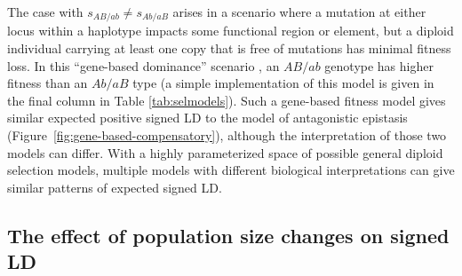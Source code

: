 \documentclass[]{article}
\begin{document}
The case with \(s_{AB/ab} \not= s_{Ab/aB}\) arises in a scenario where a
mutation at either locus within a haplotype impacts some functional region or
element, but a diploid individual carrying at least one copy that is free of
mutations has minimal fitness loss. In this ``gene-based dominance'' scenario
\citep[e.g.,][]{Sanjak2017-zw}, an \(AB/ab\) genotype has higher fitness than
an \(Ab/aB\) type (a simple implementation of this model is given in the final
column in Table \ref{tab:selmodels}). Such a gene-based fitness model gives
similar expected positive signed LD to the model of antagonistic epistasis
(Figure~\ref{fig:gene-based-compensatory}), although the interpretation of
those two models can differ. With a highly parameterized space of possible
general diploid selection models, multiple models with different biological
interpretations can give similar patterns of expected signed LD.

\subsection{The effect of population size changes on signed LD}
\label{sec:demography}
\end{document}
